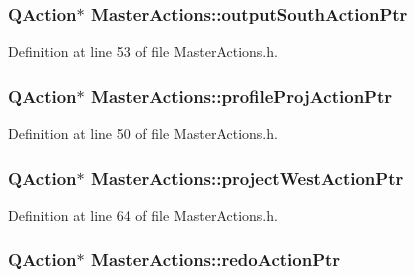 \hypertarget{class_master_actions_a5b7a85c6728274eb0fcb48924044b9f6}{
\subsubsection[{output\-South\-Action\-Ptr}]{\setlength{\rightskip}{0pt plus 5cm}Q\-Action$\ast$ Master\-Actions\-::output\-South\-Action\-Ptr\hspace{0.3cm}{\ttfamily [private]}}}\label{class_master_actions_a5b7a85c6728274eb0fcb48924044b9f6}


Definition at line 53 of file Master\-Actions.\-h.

\hypertarget{class_master_actions_a5242e5fa69f4d15c15a32b43f227e397}{
\subsubsection[{profile\-Proj\-Action\-Ptr}]{\setlength{\rightskip}{0pt plus 5cm}Q\-Action$\ast$ Master\-Actions\-::profile\-Proj\-Action\-Ptr\hspace{0.3cm}{\ttfamily [private]}}}\label{class_master_actions_a5242e5fa69f4d15c15a32b43f227e397}


Definition at line 50 of file Master\-Actions.\-h.

\hypertarget{class_master_actions_aa4160469d2e9a840448c49e95bcfa9e5}{
\subsubsection[{project\-West\-Action\-Ptr}]{\setlength{\rightskip}{0pt plus 5cm}Q\-Action$\ast$ Master\-Actions\-::project\-West\-Action\-Ptr\hspace{0.3cm}{\ttfamily [private]}}}\label{class_master_actions_aa4160469d2e9a840448c49e95bcfa9e5}


Definition at line 64 of file Master\-Actions.\-h.

\hypertarget{class_master_actions_a7936a9bf0e7418cd864b2fb1ab786d09}{
\subsubsection[{redo\-Action\-Ptr}]{\setlength{\rightskip}{0pt plus 5cm}Q\-Action$\ast$ Master\-Actions\-::redo\-Action\-Ptr\hspace{0.3cm}{\ttfamily [private]}}}\label{class_master_actions_a7936a9bf0e7418cd864b2fb1ab786d09}


